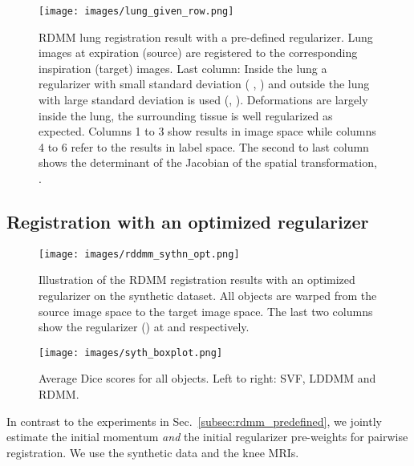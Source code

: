 \documentclass{article}
\numberwithin{equation}{section}
\begin{document}
\begin{figure}[!ht]
  \begin{center}
    \texttt{[image: images/lung\_given\_row.png]}
  \end{center}
  \caption{RDMM lung registration result with a pre-defined regularizer. Lung images at expiration (source) are registered to the corresponding  inspiration (target) images. Last column: Inside the lung a regularizer with small standard deviation ( , ) and outside the lung with large standard deviation is used (, ). Deformations are largely inside the lung, the surrounding tissue is well regularized as expected. Columns 1 to 3 show results in image space while columns 4 to 6 refer to the results in label space. The second to last column shows the determinant of the Jacobian of the spatial transformation, .\vspace{-0.5cm} }
  \label{fig:lung}
\end{figure}








\subsection{Registration with an optimized regularizer}
\label{subsec:rdmm_optimized_regularizer}

\begin{figure}[!h]
   \begin{minipage}{0.7\textwidth}
     \texttt{[image: images/rddmm\_sythn\_opt.png]}
    \caption{Illustration of the RDMM registration results with an optimized regularizer on the synthetic dataset. All objects are warped from the source image space to the target image space. The last two columns show the regularizer () at  and  respectively. }
    \label{fig:rdmm_opt_synth}
   \end{minipage}\hfill
   \begin{minipage}{0.25\textwidth}
   \vspace{-0.5em}
     \centering
     \texttt{[image: images/syth\_boxplot.png]}
     \caption{Average Dice scores for all objects. Left to right: SVF, LDDMM and RDMM.}\label{fig:syth_boxplot}
   \end{minipage}
\end{figure}

In contrast to the experiments in Sec.~\ref{subsec:rdmm_predefined}, we jointly estimate the initial momentum \emph{and} the initial regularizer pre-weights  for pairwise registration. We use the synthetic data and the knee MRIs.
\end{document}
